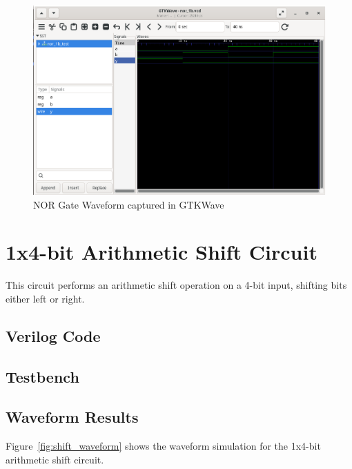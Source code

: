 \documentclass[12pt]{report}
\begin{document}
\begin{figure}[H]
    \centering
    \includegraphics[width=1.0\textwidth]{figs/NOR_GATE_WAVEFORM.png}
    \caption{NOR Gate Waveform captured in GTKWave}
    \label{fig:nor_waveform}
\end{figure}

\chapter{1x4-bit Arithmetic Shift Circuit}

This circuit performs an arithmetic shift operation on a 4-bit input, shifting bits either left or right.

\section{Verilog Code}



\section{Testbench}



\section{Waveform Results}

Figure~\ref{fig:shift_waveform} shows the waveform simulation for the 1x4-bit arithmetic shift circuit.
\end{document}
